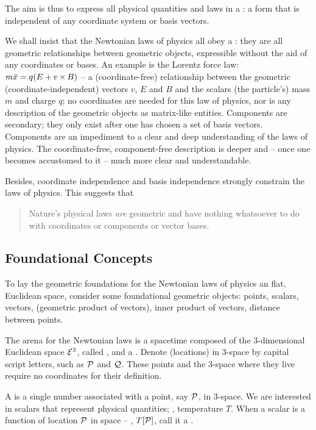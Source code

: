 The aim is thus to express all physical quantities and laws in a : a form that is independent of any coordinate system or basis vectors.

We shall insist that the Newtonian laws of physics all obey a : they are all geometric relationships between geometric objects, expressible without the aid of any coordinates or bases. An example is the Lorentz force law: $m\ddot{x} = q(E + v\operatorname{\times} B)$ -- a (coordinate-free) relationship between the geometric (coordinate-independent) vectors $v$, $E$ and $B$ and the scalars (the particle's) mass $m$ and charge $q$; no coordinates are needed for this law of physics, nor is any description of the geometric objects as matrix-like entities. Components are secondary; they only exist after one has chosen a set of basis vectors. Components are an impediment to a clear and deep understanding of the laws of physics. The coordinate-free, component-free description is deeper and -- once one becomes accustomed to it -- much more clear and understandable.

Besides, coordinate independence and basis independence strongly constrain the laws of physics. This suggests that
\begin{quote}
Nature's physical laws \emph{are} geometric and have nothing whatsoever to do with coordinates or components or vector bases.
\end{quote}


\subsection{Foundational Concepts}
To lay the geometric foundations for the Newtonian laws of physics an flat, Euclidean space, consider some foundational geometric objects: points, scalars, vectors, (geometric product of vectors), inner product of vectors, distance between points.

The arena for the Newtonian laws is a spacetime composed of the 3-dimensional Euclidean space $\mathcal{E}^{3}$, called , and a . Denote  (locations) in 3-space by capital script letters, such as $\mathcal{P}$ and $\mathcal{Q}$. These points and the 3-space where they live require no coordinates for their definition.

A  is a single number associated with a point, say $\mathcal{P}$, in 3-space. We are interested in scalars that represent physical quantities; \eg, temperature $T$. When a scalar is a function of location $\mathcal{P}$ in space -- \eg, $T\!\left[{\mathcal{P}}\right]$, call it a .

